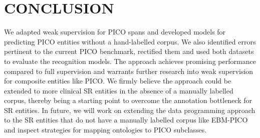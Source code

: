 \documentclass[10.7pt,]{article}
\begin{document}
\section{CONCLUSION}\label{conclusion}
%
We adapted weak supervision for PICO spans and developed models for predicting PICO entities without a hand-labelled corpus.
We also identified errors pertinent to the current PICO benchmark, rectified them and used both datasets to evaluate the recognition models.
The approach achieves promising performance compared to full supervision and warrants further research into weak supervision for composite entities like PICO.
We firmly believe the approach could be extended to more clinical SR entities in the absence of a manually labelled corpus, thereby being a starting point to overcome the annotation bottleneck for SR entities.
In future, we will work on extending the data programming approach to the SR entities that do not have a manually labelled corpus like EBM-PICO and inspect strategies for mapping ontologies to PICO subclasses.
%
%
%
%
%
%
%
%
%
%
%


\end{document}
